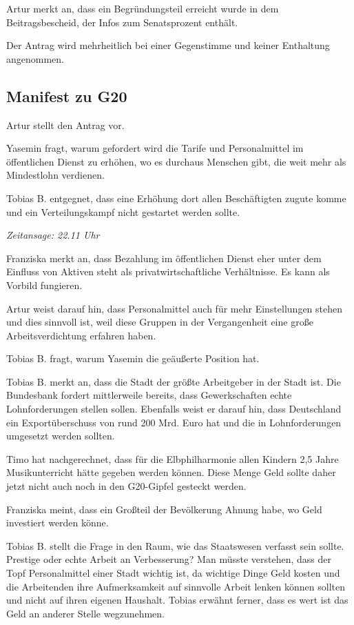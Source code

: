 \documentclass[ngerman,headheight=70pt]{scrartcl}
\begin{document}
    Artur merkt an, dass ein Begründungsteil erreicht wurde in dem Beitragsbescheid,
    der Infos zum Senatsprozent enthält.

    Der Antrag wird mehrheitlich bei einer Gegenstimme und keiner Enthaltung
    angenommen.

    \subsection{Manifest zu G20}

    Artur stellt den Antrag vor.

    Yasemin fragt, warum gefordert wird die Tarife und Personalmittel im
    öffentlichen Dienst zu erhöhen, wo es durchaus Menschen gibt, die weit mehr
    als Mindestlohn verdienen.

    Tobias B. entgegnet, dass eine Erhöhung dort allen Beschäftigten zugute komme
    und ein Verteilungskampf nicht gestartet werden sollte.

    \textit{Zeitansage: 22.11 Uhr}

    Franziska merkt an, dass Bezahlung im öffentlichen Dienst eher unter dem Einfluss
    von Aktiven steht als privatwirtschaftliche Verhältnisse. Es kann als Vorbild
    fungieren.

    Artur weist darauf hin, dass Personalmittel auch für mehr Einstellungen
    stehen und dies sinnvoll ist, weil diese Gruppen in der Vergangenheit eine
    große Arbeitsverdichtung erfahren haben.

    Tobias B. fragt, warum Yasemin die geäußerte Position hat.

    Tobias B. merkt an, dass die Stadt der größte Arbeitgeber in der Stadt ist.
    Die Bundesbank fordert mittlerweile bereits, dass Gewerkschaften echte
    Lohnforderungen stellen sollen. Ebenfalls weist er darauf hin, dass Deutschland
    ein Exportüberschuss von rund 200 Mrd. Euro hat und die in Lohnforderungen
    umgesetzt werden sollten.

    Timo hat nachgerechnet, dass für die Elbphilharmonie allen Kindern 2,5 Jahre
    Musikunterricht hätte gegeben werden können. Diese Menge Geld sollte daher
    jetzt nicht auch noch in den G20-Gipfel gesteckt werden.

    Franziska meint, dass ein Großteil der Bevölkerung Ahnung habe, wo Geld
    investiert werden könne.

    Tobias B. stellt die Frage in den Raum, wie das Staatswesen verfasst sein
    sollte. Prestige oder echte Arbeit an Verbesserung? Man müsste verstehen, dass
    der Topf Personalmittel einer Stadt wichtig ist, da wichtige Dinge Geld
    kosten und die Arbeitenden ihre Aufmerksamkeit auf sinnvolle Arbeit lenken
    können sollten und nicht auf ihren eigenen Haushalt.
    Tobias erwähnt ferner, dass es wert ist das Geld an anderer Stelle wegzunehmen.
\end{document}
